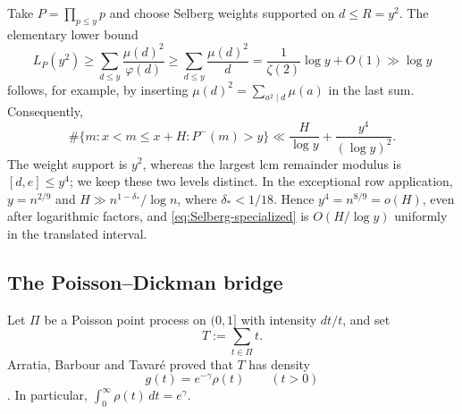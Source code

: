 \documentclass[11pt]{article}
\numberwithin{equation}{section}
\theoremstyle{definition}
\theoremstyle{remark}
\newcommand{\1}{\mathbf 1}
\begin{document}
Take \(P=\prod_{p\leq y}p\) and choose Selberg weights supported on
\(d\leq R=y^2\).  The elementary lower bound
\[
 L_P(y^2)\geq\sum_{d\leq y}\frac{\mu(d)^2}{\varphi(d)}
 \geq\sum_{d\leq y}\frac{\mu(d)^2}{d}
 =\frac1{\zeta(2)}\log y+O(1)
 \gg\log y
\]
follows, for example, by inserting
\(\mu(d)^2=\sum_{a^2\mid d}\mu(a)\) in the last sum.  Consequently,
\begin{equation}
 \label{eq:Selberg-specialized}
 \#\{m:x<m\leq x+H:P^-(m)>y\}
 \ll\frac H{\log y}+\frac{y^4}{(\log y)^2}.
\end{equation}
The weight support is \(y^2\), whereas the largest lcm remainder modulus is
\([d,e]\leq y^4\); we keep these two levels distinct.  In the exceptional
row application, \(y=n^{2/9}\) and
\(H\gg n^{1-\delta_*}/\log n\), where \(\delta_*<1/18\).  Hence
\(y^4=n^{8/9}=o(H)\), even after logarithmic factors, and
\eqref{eq:Selberg-specialized} is \(O(H/\log y)\) uniformly in the
translated interval.

\subsection{The Poisson--Dickman bridge}
\label{subsec:Poisson-Dickman}

Let \(\Pi\) be a Poisson point process on \((0,1]\) with intensity
\(dt/t\), and set
\[
                         T:=\sum_{t\in\Pi}t.
\]
Arratia, Barbour and Tavar\'e proved that \(T\) has density
\begin{equation}
 \label{eq:Poisson-Dickman-density}
                         g(t)=e^{-\gamma}\rho(t)
                         \qquad(t>0)
\end{equation}
\cite[(2.3)--(2.6)]{ArratiaBarbourTavare1999}.  In particular,
\(\int_0^\infty\rho(t)\,dt=e^\gamma\).
\end{document}
